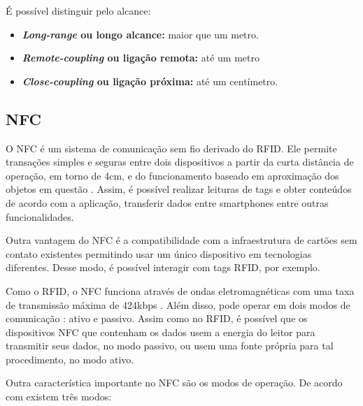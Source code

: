 É possível distinguir pelo alcance:

\begin{itemize} \parskip -4pt
	\item \textbf{\textit{Long-range} ou longo alcance:} maior que um metro.
	\item \textbf{\textit{Remote-coupling} ou ligação remota:} até um metro
	\item \textbf{\textit{Close-coupling} ou ligação próxima:} até um centímetro.
\end{itemize}


\subsection{NFC}
O NFC é um sistema de comunicação sem fio derivado do RFID. Ele permite transações simples e seguras entre dois dispositivos a partir da curta distância de operação, em torno de 4cm, e do funcionamento baseado em aproximação dos objetos em questão \cite{NFCForum2016}. 
Assim, é possível realizar leituras de tags e obter conteúdos de acordo com a aplicação, transferir dados entre smartphones entre outras funcionalidades.

Outra vantagem do NFC é a compatibilidade com a infraestrutura de cartões sem contato existentes permitindo usar um único dispositivo em tecnologias diferentes. Desse modo, é possível interagir com tags RFID, por exemplo.


Como o RFID, o NFC funciona através de ondas eletromagnéticas com uma taxa de transmissão máxima de 424kbps \cite{NFCForum2016}. Além disso, pode operar em dois modos de comunicação \cite{Igoe2014}: ativo e passivo. Assim como no RFID, é possível que os dispositivos NFC que contenham os dados usem a energia do leitor para transmitir seus dados, no modo passivo, ou usem uma fonte própria para tal procedimento, no modo ativo.


Outra característica importante no NFC são os modos de operação. De acordo com \citeauthor{NFCForum2016} existem três modos:

